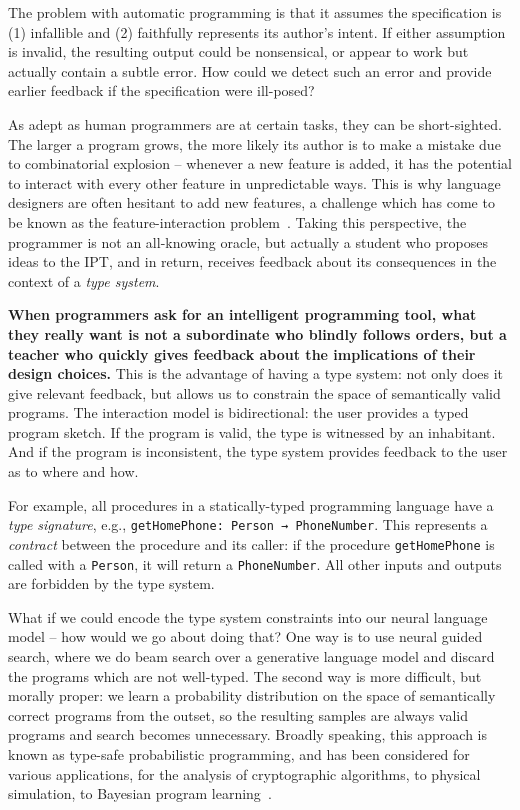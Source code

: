 \documentclass[12pt]{article}
\begin{document}
\noindent The problem with automatic programming is that it assumes the specification is (1) infallible and (2) faithfully represents its author's intent. If either assumption is invalid, the resulting output could be nonsensical, or appear to work but actually contain a subtle error. How could we detect such an error and provide earlier feedback if the specification were ill-posed?

As adept as human programmers are at certain tasks, they can be short-sighted. The larger a program grows, the more likely its author is to make a mistake due to combinatorial explosion -- whenever a new feature is added, it has the potential to interact with every other feature in unpredictable ways. This is why language designers are often hesitant to add new features, a challenge which has come to be known as the feature-interaction problem~\cite{apel2013exploring}. Taking this perspective, the programmer is not an all-knowing oracle, but actually a student who proposes ideas to the IPT, and in return, receives feedback about its consequences in the context of a \textit{type system}.

\textbf{When programmers ask for an intelligent programming tool, what they really want is not a subordinate who blindly follows orders, but a teacher who quickly gives feedback about the implications of their design choices.} This is the advantage of having a type system: not only does it give relevant feedback, but allows us to constrain the space of semantically valid programs. The interaction model is bidirectional: the user provides a typed program sketch. If the program is valid, the type is witnessed by an inhabitant. And if the program is inconsistent, the type system provides feedback to the user as to where and how.

For example, all procedures in a statically-typed programming language have a \textit{type signature}, e.g., \texttt{getHomePhone: Person → PhoneNumber}. This represents a \textit{contract} between the procedure and its caller: if the procedure \texttt{getHomePhone} is called with a \texttt{Person}, it will return a \texttt{PhoneNumber}. All other inputs and outputs are forbidden by the type system.

What if we could encode the type system constraints into our neural language model -- how would we go about doing that? One way is to use neural guided search, where we do beam search over a generative language model and discard the programs which are not well-typed. The second way is more difficult, but morally proper: we learn a probability distribution on the space of semantically correct programs from the outset, so the resulting samples are always valid programs and search becomes unnecessary. Broadly speaking, this approach is known as type-safe probabilistic programming, and has been considered for various applications, for the analysis of cryptographic algorithms, to physical simulation, to Bayesian program learning~\cite{murali2017bayesian}.
\end{document}

